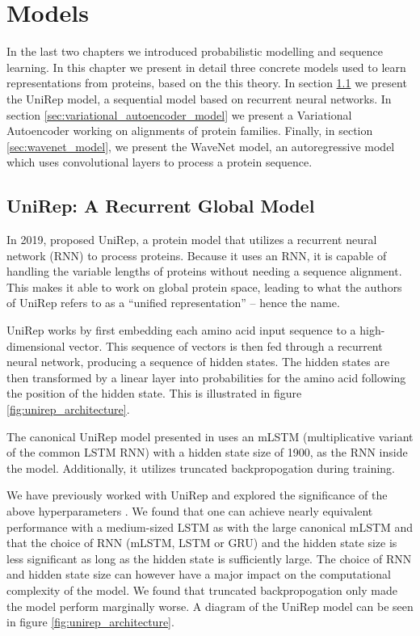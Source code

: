 \chapter{Models}
\label{chapter:models}

In the last two chapters we introduced probabilistic modelling and sequence learning. In this chapter we present in detail three concrete models used to learn representations from proteins, based on the this theory. In section \ref{sec:unirep_model} we present the UniRep model, a sequential model based on recurrent neural networks. In section \ref{sec:variational_autoencoder_model} we present a Variational Autoencoder working on alignments of protein families. Finally, in section \ref{sec:wavenet_model}, we present the WaveNet model, an autoregressive model which uses convolutional layers to process a protein sequence.%

\section{UniRep: A Recurrent Global Model}
\label{sec:unirep_model}
In 2019, \textcite{alley2019unified} proposed UniRep, a protein model that utilizes a recurrent neural network (RNN) to process proteins. Because it uses an RNN, it is capable of handling the variable lengths of proteins without needing a sequence alignment. This makes it able to work on global protein space, leading to what the authors of UniRep refers to as a ``unified representation'' -- hence the name.

UniRep works by first embedding each amino acid input sequence to a high-dimensional vector. This sequence of vectors is then fed through a recurrent neural network, producing a sequence of hidden states. The hidden states are then transformed by a linear layer into probabilities for the amino acid following the position of the hidden state. This is illustrated in figure \ref{fig:unirep_architecture}.

The canonical UniRep model presented in \textcite{alley2019unified} uses an mLSTM (multiplicative  variant of the common LSTM RNN) with a hidden state size of 1900, as the RNN inside the model. Additionally, it utilizes truncated backpropogation during training.

We have previously worked with UniRep and explored the significance of the above hyperparameters \cite{unirepproject}. We found that one can achieve nearly equivalent performance with a medium-sized LSTM as with the large canonical mLSTM and that the choice of RNN (mLSTM, LSTM or GRU) and the hidden state size is less significant as long as the hidden state is sufficiently large. The choice of RNN and hidden state size can however have a major impact on the computational complexity of the model. We found that truncated backpropogation only made the model perform marginally worse. A diagram of the UniRep model can be seen in figure \ref{fig:unirep_architecture}.

